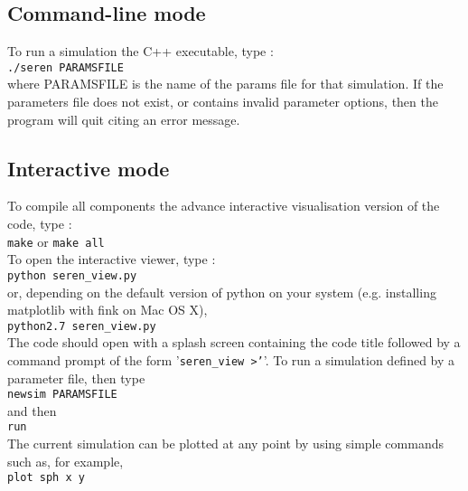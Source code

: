 \documentclass[a4paper]{article}
\newcommand{\var}[1]{\texttt{#1}}
\begin{document}
\subsection{Command-line mode}

\noindent To run a simulation the C++ executable, type : \\
\newline
\var{./seren PARAMSFILE} \\
\newline
where PARAMSFILE is the name of the params file for that simulation.  If the parameters file does not exist, or contains invalid parameter options, then the program will quit citing an error message.


\subsection{Interactive mode}

To compile all components the advance interactive visualisation version of the code, type :\\
\newline
\noindent \var{make} or \var{make all} \\

\noindent To open the interactive viewer, type : \\
\newline
\var{python seren\_view.py} \\
\newline
or, depending on the default version of python on your system (e.g. installing matplotlib with fink on Mac OS X), \\
\newline
\var{python2.7 seren\_view.py} \\
\newline
\noindent The code should open with a splash screen containing the code title followed by a command prompt of the form '\var{seren\_view >'}'.  To run a simulation defined by a parameter file, then type \\
\newline
\var{newsim PARAMSFILE} \\
\newline
\noindent and then \\
\newline
\var{run} \\
\newline
\noindent The current simulation can be plotted at any point by using simple commands such as, for example, \\
\newline
\var{plot sph x y} \\
\end{document}
